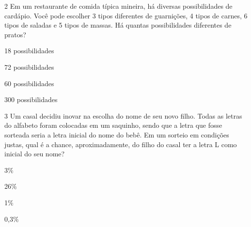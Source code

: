 




\num{2} Em um restaurante de comida típica mineira, há diversas
possibilidades de cardápio. Você pode escolher 3 tipos diferentes de
guarnições, 4 tipos de carnes, 6 tipos de saladas e 5 tipos de massas.
Há quantas possibilidades diferentes de pratos?
\item 18 possibilidades
\item 72 possibilidades
\item 60 possibilidades
\item 300 possibilidades









\num{3} Um casal decidiu inovar na escolha do nome de seu novo filho. Todas
as letras do alfabeto foram colocadas em um saquinho, sendo que a letra
que fosse sorteada seria a letra inicial do nome do bebê. Em um sorteio
em condições justas, qual é a chance, aproximadamente, do filho do casal
ter a letra L como inicial do seu nome?
\item 3\%
\item 26\%
\item 1\%
\item 0,3\%

